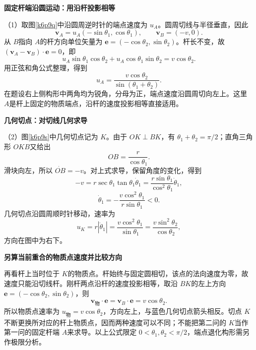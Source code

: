 \begin{solution}\textbf{固定杆端沿圆运动：用沿杆投影相等}\par\nobreak
（1）取图\ref{k6p9q}中沿圆周逆时针的端点速度为 $u_A$。圆周切线与半径垂直，因此
\[\bm v_A=u_A(-\sin\theta_1,\cos\theta_1),\qquad
\bm v_B=(-v,0).\]
从 $B$指向 $A$的杆方向单位矢量为 $\bm e=(-\cos\theta_2,\sin\theta_2)$。杆长不变，故 $(\bm v_A-\bm v_B)\cdot\bm e=0$，即
\[u_A\sin\theta_1\cos\theta_2
  +u_A\cos\theta_1\sin\theta_2=v\cos\theta_2.\]
用正弦和角公式整理，得到
\[\boxed{u_A=\frac{v\cos\theta_2}{\sin(\theta_1+\theta_2)}}.\]
在题设右上侧构形中两角均为锐角，分母为正，端点速度沿圆周切向左上。这里 $A$是杆上固定的物质端点，沿杆的速度投影相等直接适用。




\par\medskip{}\noindent\textbf{几何切点：对切线几何求导}\par\nobreak
（2）图\ref{k6p9s}中几何切点记为 $K$。由于 $OK\perp BK$，有 $\theta_1+\theta_2=\pi/2$；直角三角形 $OKB$又给出
\[OB=\frac r{\cos\theta_1}.\]
滑块向左，所以 $\dot{OB}=-v$。对上式求导，保留角度的变化，得到
\[-v=r\sec\theta_1\tan\theta_1\dot\theta_1
    =\frac{r\sin\theta_1}{\cos^2\theta_1}\dot\theta_1,\]
\[\dot\theta_1=-\frac{v\cos^2\theta_1}{r\sin\theta_1}<0.\]
几何切点沿圆周顺时针移动，速率为
\[\boxed{u_K=r|\dot\theta_1|
       =\frac{v\cos^2\theta_1}{\sin\theta_1}
       =\frac{v\sin^2\theta_2}{\cos\theta_2}},\]
方向在图中为右下。



\par\medskip{}\noindent\textbf{另算当前重合的物质点速度并比较方向}\par\nobreak
再看杆上当时位于 $K$的物质点。杆始终与固定圆相切，该点的法向速度为零，故速度只能沿切线杆。刚杆两点沿杆的速度投影相等，取沿 $BK$的左上方向 $\bm e=(-\cos\theta_2,\sin\theta_2)$，则
\[\bm v_{\text{物}}\cdot\bm e=\bm v_B\cdot\bm e
        =v\cos\theta_2.\]
所以物质点速率为 $\boxed{u_{\text{物}}=v\cos\theta_2}$，方向左上，与蓝色几何切点箭头相反。切点 $K$不断更换所对应的杆上物质点，因而两种速度可以不同；不能把第二问的 $K$当作第一问的固定杆端 $A$来求导。以上公式限定 $0<\theta_1,\theta_2<\pi/2$，端点退化构形需另作极限分析。\end{solution}

